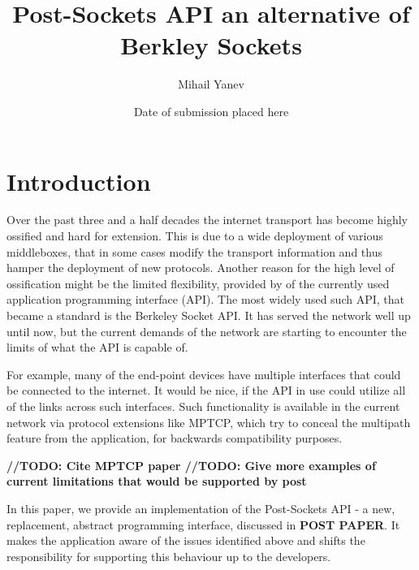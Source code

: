 \documentclass{mprop}
\begin{document}
\title{Post-Sockets API an alternative of Berkley Sockets}
\author{Mihail Yanev}
\date{Date of submission placed here}
\maketitle

\tableofcontents
\newpage

\section{Introduction}\label{intro}

\qquad Over the past three and a half decades the internet transport has become highly ossified and hard for extension. This is due to a wide deployment of various middleboxes, that in some cases modify the transport information and thus hamper the deployment of new protocols. Another reason for the high level of ossification might be the limited flexibility, provided by of the currently used application programming interface (API). The most widely used such API, that became a standard is the Berkeley Socket API. It has served the network well up until now, but the current demands of the network are starting to encounter the limits of what the API is capable of.

\qquad	For example, many of the end-point devices have multiple interfaces that could be connected to the internet. It would be nice, if the API in use could utilize all of the links across such interfaces. Such functionality is available in the current network via protocol extensions like MPTCP, which try to conceal the multipath feature from the application, for backwards compatibility purposes.

\textbf{//TODO: Cite MPTCP paper
\linebreak
//TODO: Give more examples of current limitations that would be supported by post 
}


\qquad In this paper, we provide an implementation of the Post-Sockets API - a new, replacement, abstract programming interface, discussed in \textbf{POST PAPER}. It makes the application aware of the issues identified above and shifts the responsibility for supporting this behaviour up to the developers.
\end{document}
